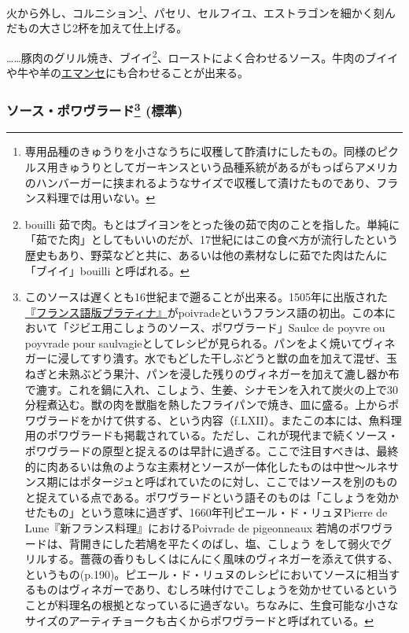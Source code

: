 \begin{recette}
火から外し、コルニション\footnote{専用品種のきゅうりを小さなうちに収穫して酢漬けにしたもの。同様のピクルス用きゅうりとしてガーキンスという品種系統があるがもっぱらアメリカのハンバーガーに挟まれるようなサイズで収穫して漬けたものであり、フランス料理では用いない。}、パセリ、セルフイユ、エストラゴンを細かく刻んだもの大さじ2杯を加えて仕上げる。

\ldots{}\ldots{}豚肉のグリル焼き、ブイイ\footnote{bouilli
  茹で肉。もとはブイヨンをとった後の茹で肉のことを指した。単純に「茹でた肉」としてもいいのだが、17世紀にはこの食べ方が流行したという歴史もあり、野菜などと共に、あるいは他の素材なしに茹でた肉はたんに「ブイイ」bouilli
  と呼ばれる。}、ローストによく合わせるソース。牛肉のブイイや牛や羊の\protect\hyperlink{}{エマンセ}にも合わせることが出来る。

\hypertarget{sauce-poivrade}{%
\subsubsection[ソース・ポワヴラード
(標準)]{\texorpdfstring{ソース・ポワヴラード\footnote{このソースは遅くとも16世紀まで遡ることが出来る。1505年に出版された\href{http://gallica.bnf.fr/ark:/12148/bpt6k792720}{『フランス語版プラティナ』}がpoivradeというフランス語の初出。この本において「ジビエ用こしょうのソース、ポワヴラード」Saulce
  de poyvre ou poyvrade pour
  saulvagieとしてレシピが見られる。パンをよく焼いてヴィネガーに浸してすり潰す。水でもどした干しぶどうと獣の血を加えて混ぜ、玉ねぎと未熟ぶどう果汁、パンを浸した残りのヴィネガーを加えて漉し器か布で漉す。これを鍋に入れ、こしょう、生姜、シナモンを入れて炭火の上で30分程煮込む。獣の肉を獣脂を熱したフライパンで焼き、皿に盛る。上からポワヴラードをかけて供する、という内容（f.LXII）。またこの本には、魚料理用のポワヴラードも掲載されている。ただし、これが現代まで続くソース・ポワヴラードの原型と捉えるのは早計に過ぎる。ここで注目すべきは、最終的に肉あるいは魚のような主素材とソースが一体化したものは中世〜ルネサンス期にはポタージュと呼ばれていたのに対し、ここではソースを別のものと捉えている点である。ポワヴラードという語そのものは「こしょうを効かせたもの」という意味に過ぎず、1660年刊ピエール・ド・リュヌPierre
  de Lune『新フランス料理』におけるPoivrade de pigeonneaux
  若鳩のポワヴラードは、背開きにした若鳩を平たくのばし、塩、こしょう
  をして弱火でグリルする。薔薇の香りもしくはにんにく風味のヴィネガーを添えて供する、というもの(p.190)。ピエール・ド・リュヌのレシピにおいてソースに相当するものはヴィネガーであり、むしろ味付けでこしょうを効かせているということが料理名の根拠となっているに過ぎない。ちなみに、生食可能な小さなサイズのアーティチョークも古くからポワヴラードと呼ばれている。}
(標準)}{ソース・ポワヴラード (標準)}}\label{sauce-poivrade}}


\end{recette}
